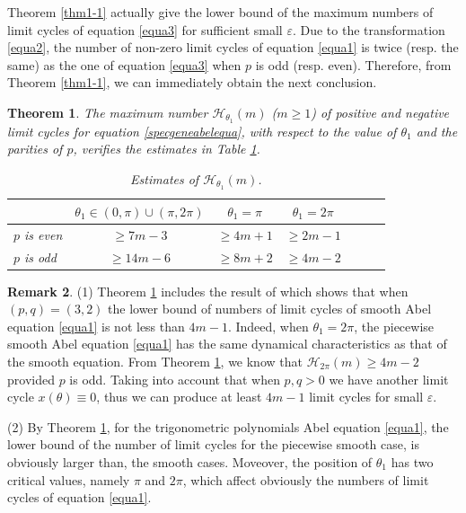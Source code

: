 \documentclass[11pt]{amsart}
\newtheorem{thm}{Theorem}[section]
\theoremstyle{remark}
\theoremstyle{definition}
\newtheorem{rem}[thm]{Remark}
\begin{document}
Theorem \ref{thm1-1} actually give the lower bound of  the maximum  numbers of limit cycles of equation \eqref{equa3} for sufficient small $\varepsilon$.   Due to the transformation \eqref{equa2},   the number of non-zero limit cycles of equation \eqref{equa1} is twice (resp. the same) as the one of equation \eqref{equa3} when $p$ is odd (resp. even).  Therefore,
from Theorem \ref{thm1-1}, we  can immediately obtain the next conclusion.


\begin{thm}\label{Theorem1-3}
The maximum number $\mathcal H_{\theta_1}(m)$   ($m\geq1$) of positive and negative limit cycles for equation \eqref{specgeneabelequa}, with respect to the value of $\theta_1$ and the parities of $p$, verifies the estimates in Table \ref{table2}.
\begin{table}[hpt]\label{table2}
 \centering
 \renewcommand\arraystretch{1.5}
\begin{tabular}{|l|*{6}{c|}}\hline
 &$\theta_{1}\in(0,\pi)\cup(\pi,2\pi)$ &$\theta_{1}=\pi$ &$\theta_{1}=2\pi$  \\ \hline
   $p$ is even&$\geq 7m-3$ &   $\geq 4m+1$   & $\geq 2m-1$  \\ \hline
   $p$ is odd &$\geq 14m-6$ &$\geq 8m+2$  &$\geq 4m-2$   \\ \hline
\end{tabular}
\vskip0.1cm
\caption{Estimates of $\mathcal H_{\theta_1}(m)$. }\vspace{-0.7cm}
\end{table}
\end{thm}

\begin{rem} (1)   Theorem \ref{Theorem1-3}  includes the result of \cite{HTC2020} which shows   that when $(p,q)=(3,2)$ the lower bound of numbers of limit cycles of smooth  Abel equation \eqref{equa1} is not less than $4m-1$. Indeed,
   when $\theta_{1}=2\pi$, the piecewise smooth  Abel equation \eqref{equa1} has
the same dynamical    characteristics as that of  the smooth equation. From Theorem \ref{Theorem1-3}, we know that $\mathcal H_{2\pi}(m)\geq 4m-2$ provided  $p$ is odd. Taking into account that when $p, q>0$ we have another limit cycle $x(\theta)\equiv 0$, thus
           we can produce at least $4m-1$ limit cycles for small $\varepsilon$.

           (2) By Theorem \ref{Theorem1-3}, for the trigonometric  polynomials Abel equation \eqref{equa1},  the  lower bound of the number of limit cycles  for  the piecewise smooth case,
is obviously larger than, the smooth cases. Moveover, the position of   $\theta_1$ has two critical values,  namely  $\pi$ and $2\pi$,   which affect obviously the numbers  of limit cycles of   equation \eqref{equa1}.
\end{rem}
\end{document}
